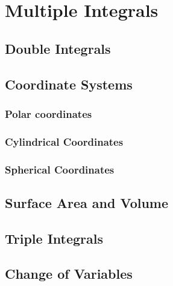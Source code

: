 \chapter{Multiple Integrals}

\section{Double Integrals}

\section{Coordinate Systems}
\subsection{Polar coordinates}
\subsection{Cylindrical Coordinates}
\subsection{Spherical Coordinates}

\section{Surface Area and Volume}

\section{Triple Integrals}

\section{Change of Variables}

